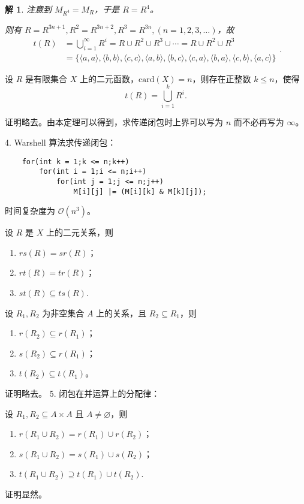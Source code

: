 \documentclass[normal,cyan]{elegantnote}
\newtheorem{solve}{解}
\begin{document}
\begin{solve}
    注意到 $M_{R^4} = M_R$，于是 $R = R^4$。

    则有 $R = R^{3n+1},R^2 = R^{3n+2}, R^3 = R^{3n},(n = 1, 2, 3, \dots)$，故 $$\begin{aligned}
        t(R) &=\bigcup_{i=1}^{\infty} R^{i}=R \cup R^{2} \cup R^{3} \cup \cdots=R \cup R^{2} \cup R^{3} \\
        &=\{\langle a, a\rangle,\langle b, b\rangle,\langle c, c\rangle,\langle a, b\rangle,\langle b, c\rangle,\langle c, a\rangle,\langle b, a\rangle,\langle c, b\rangle,\langle a, c\rangle\}
        \end{aligned}.$$
\end{solve}
\begin{theorem}
    设 $R$ 是有限集合 $X$ 上的二元函数，$\mathrm{card}(X) = n$，则存在正整数 $k \leq n$，使得 $$t(R) = \bigcup\limits_{i = 1}^k R^i.$$
\end{theorem}
证明略去。由本定理可以得到，求传递闭包时上界可以写为 $n$ 而不必再写为 $\infty$。

4. Warshell 算法求传递闭包：
\begin{verbatim}
    for(int k = 1;k <= n;k++)
        for(int i = 1;i <= n;i++)
            for(int j = 1;j <= n;j++)
                M[i][j] |= (M[i][k] & M[k][j]);
\end{verbatim}
时间复杂度为 $\mathcal{O}(n^3)$。
\begin{theorem}
    设 $R$ 是 $X$ 上的二元关系，则
    \begin{enumerate}
        \item $rs(R) = sr(R)$；
        \item $rt(R) = tr(R)$；
        \item $st(R) \subseteq ts(R)$.
    \end{enumerate}
    设 $R_1, R_2$ 为非空集合 $A$ 上的关系，且 $R_2 \subseteq R_1$，则
    \begin{enumerate}
        \item $r(R_2) \subseteq r(R_1)$；
        \item $s(R_2) \subseteq r(R_1)$；
        \item $t(R_2) \subseteq t(R_1)$。
    \end{enumerate}
\end{theorem}
证明略去。
5. 闭包在并运算上的分配律：
\begin{theorem}
    设 $R_1, R_2 \subseteq A \times A$ 且 $A \neq \varnothing$，则
    \begin{enumerate}
        \item $r(R_1 \cup R_2) = r(R_1) \cup r(R_2)$；
        \item $s(R_1 \cup R_2) = s(R_1) \cup s(R_2)$；
        \item $t(R_1 \cup R_2) \supseteq t(R_1) \cup t(R_2)$.
    \end{enumerate}
\end{theorem}
证明显然。
\end{document}
